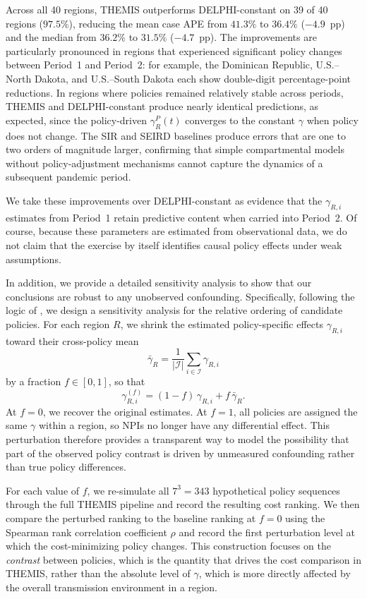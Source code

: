 \documentclass[letterpaper,twoside,11pt]{reviewresponse}
\begin{document}
Across all 40 regions, THEMIS outperforms DELPHI-constant on 39 of 40 regions ($97.5\%$), reducing the mean case APE from $41.3\%$ to $36.4\%$ ($-4.9$~pp) and the median from $36.2\%$ to $31.5\%$ ($-4.7$~pp). The improvements are particularly pronounced in regions that experienced significant policy changes between Period~1 and Period~2: for example, the Dominican Republic, U.S.--North Dakota, and U.S.--South Dakota each show double-digit percentage-point reductions. In regions where policies remained relatively stable across periods, THEMIS and DELPHI-constant produce nearly identical predictions, as expected, since the policy-driven $\gamma_R^P(t)$ converges to the constant $\gamma$ when policy does not change. The SIR and SEIRD baselines produce errors that are one to two orders of magnitude larger, confirming that simple compartmental models without policy-adjustment mechanisms cannot capture the dynamics of a subsequent pandemic period.

We take these improvements over DELPHI-constant as evidence that the $\gamma_{R,i}$ estimates from Period~1 retain predictive content when carried into Period~2. Of course, because these parameters are estimated from observational data, we do not claim that the exercise by itself identifies causal policy effects under weak assumptions.

In addition, we provide a detailed sensitivity analysis to show that our conclusions are robust to any unobserved confounding. Specifically, following the logic of \citet{cinelli2020making}, we design a sensitivity analysis for the relative ordering of candidate policies. For each region $R$, we shrink the estimated policy-specific effects $\gamma_{R,i}$ toward their cross-policy mean
\[
\bar{\gamma}_R = \frac{1}{|\mathcal{I}|}\sum_{i\in\mathcal{I}} \gamma_{R,i}
\]
by a fraction $f \in [0,1]$, so that
\[
\gamma_{R,i}^{(f)} = (1-f)\,\gamma_{R,i} + f\,\bar{\gamma}_R.
\]
At $f=0$, we recover the original estimates. At $f=1$, all policies are assigned the same $\gamma$ within a region, so NPIs no longer have any differential effect. This perturbation therefore provides a transparent way to model the possibility that part of the observed policy contrast is driven by unmeasured confounding rather than true policy differences.

For each value of $f$, we re-simulate all $7^3 = 343$ hypothetical policy sequences through the full THEMIS pipeline and record the resulting cost ranking. We then compare the perturbed ranking to the baseline ranking at $f=0$ using the Spearman rank correlation coefficient $\rho$ and record the first perturbation level at which the cost-minimizing policy changes. This construction focuses on the \emph{contrast} between policies, which is the quantity that drives the cost comparison in THEMIS, rather than the absolute level of $\gamma$, which is more directly affected by the overall transmission environment in a region.
\end{document}
